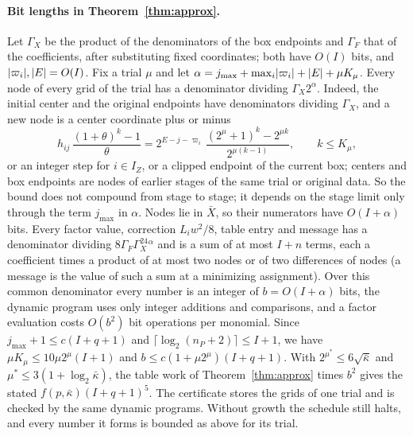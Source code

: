 \paragraph{Bit lengths in Theorem~\ref{thm:approx}.}
Let $\Gamma_X$ be the product of the denominators of the box endpoints and
$\Gamma_F$ that of the coefficients, after substituting fixed coordinates;
both have $O(I)$ bits, and $\lvert \varpi_i\rvert,\lvert E\rvert=O(I)$. Fix a trial $\mu$
and let $\alpha=j_{\max}+\max_i\lvert \varpi_i\rvert+\lvert E\rvert+\mu K_\mu$. Every node of
every grid of the trial has a denominator dividing $\Gamma_X2^\alpha$. Indeed, the initial
center and the original endpoints have denominators dividing $\Gamma_X$, and a
new node is a center coordinate plus or minus
\[
h_{ij}\,\frac{(1+\theta)^k-1}{\theta}
=2^{E-j-\varpi_i}\,\frac{(2^\mu+1)^k-2^{\mu k}}{2^{\mu(k-1)}},\qquad k\le K_\mu,
\]
or an integer step for $i\in I_Z$, or a clipped endpoint of the current box;
centers and box endpoints are nodes of earlier stages of the same trial or
original data. So the bound does not compound from stage to stage; it
depends on the stage limit only through the term $j_{\max}$ in $\alpha$. Nodes
lie in $\bar X$, so their numerators have $O(I+\alpha)$ bits. Every factor
value, correction $L_iw^2/8$, table entry and message has a denominator
dividing $8\Gamma_F\Gamma_X^24^\alpha$ and is a sum of at most $I+n$ terms,
each a coefficient times a product of at most two nodes or of two
differences of nodes (a message is the value of such a sum at a minimizing
assignment). Over this common denominator every number is an integer of
$b=O(I+\alpha)$ bits, the dynamic program uses only integer additions and
comparisons, and a factor evaluation costs $O(b^2)$ bit operations per
monomial. Since $j_{\max}+1\le c(I+q+1)$ and $\lceil\log_2(n_P+2)\rceil\le I+1$, we
have $\mu K_\mu\le10\mu2^\mu(I+1)$ and $b\le c(1+\mu2^\mu)(I+q+1)$. With
$2^{\mu^*}\le6\sqrt{\bar\kappa}$ and $\mu^*\le3(1+\log_2\bar\kappa)$, the
table work of Theorem~\ref{thm:approx} times $b^2$ gives the stated
$f(p,\bar\kappa)(I+q+1)^5$. The certificate stores the grids of one trial and
is checked by the same dynamic programs. Without growth the schedule still
halts, and every number it forms is bounded as above for its trial.

